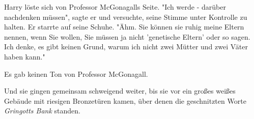 Harry löste sich von Professor McGonagalls Seite. "Ich werde - darüber nachdenken müssen", sagte er und versuchte, seine Stimme unter Kontrolle zu halten. Er starrte auf seine Schuhe. "Ähm. Sie können sie ruhig meine Eltern nennen, wenn Sie wollen, Sie müssen ja nicht 'genetische Eltern' oder so sagen. Ich denke, es gibt keinen Grund, warum ich nicht zwei Mütter und zwei Väter haben kann."

Es gab keinen Ton von Professor McGonagall.

Und sie gingen gemeinsam schweigend weiter, bis sie vor ein großes weißes Gebäude mit riesigen Bronzetüren kamen, über denen die geschnitzten Worte \emph{Gringotts Bank} standen. 

